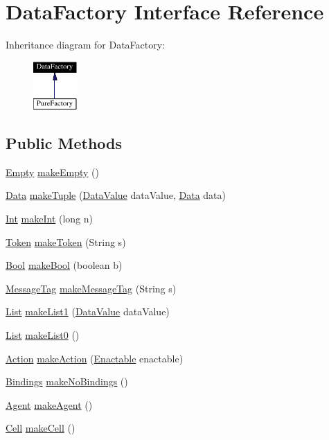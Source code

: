 \hypertarget{interfaceDataFactory}{
\section{Data\-Factory  Interface Reference}
\label{interfaceDataFactory}
}
Inheritance diagram for Data\-Factory:\begin{figure}[H]
\begin{center}
\leavevmode
\includegraphics[width=47pt]{interfaceDataFactory__inherit__graph}
\end{center}
\end{figure}
\subsection*{Public Methods}
\begin{CompactItemize}
\item 
\hyperlink{interfaceEmpty}{Empty} \hyperlink{interfaceDataFactory_a0}{make\-Empty} ()
\item 
\hyperlink{interfaceData}{Data} \hyperlink{interfaceDataFactory_a1}{make\-Tuple} (\hyperlink{interfaceDataValue}{Data\-Value} data\-Value, \hyperlink{interfaceData}{Data} data)
\item 
\hyperlink{interfaceInt}{Int} \hyperlink{interfaceDataFactory_a2}{make\-Int} (long n)
\item 
\hyperlink{interfaceToken}{Token} \hyperlink{interfaceDataFactory_a3}{make\-Token} (String s)
\item 
\hyperlink{interfaceBool}{Bool} \hyperlink{interfaceDataFactory_a4}{make\-Bool} (boolean b)
\item 
\hyperlink{interfaceMessageTag}{Message\-Tag} \hyperlink{interfaceDataFactory_a5}{make\-Message\-Tag} (String s)
\item 
\hyperlink{interfaceList}{List} \hyperlink{interfaceDataFactory_a6}{make\-List1} (\hyperlink{interfaceDataValue}{Data\-Value} data\-Value)
\item 
\hyperlink{interfaceList}{List} \hyperlink{interfaceDataFactory_a7}{make\-List0} ()
\item 
\hyperlink{interfaceAction}{Action} \hyperlink{interfaceDataFactory_a8}{make\-Action} (\hyperlink{interfaceEnactable}{Enactable} enactable)
\item 
\hyperlink{interfaceBindings}{Bindings} \hyperlink{interfaceDataFactory_a9}{make\-No\-Bindings} ()
\item 
\hyperlink{interfaceAgent}{Agent} \hyperlink{interfaceDataFactory_a10}{make\-Agent} ()
\item 
\hyperlink{interfaceCell}{Cell} \hyperlink{interfaceDataFactory_a11}{make\-Cell} ()
\end{CompactItemize}


